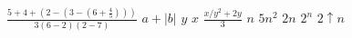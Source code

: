 \documentclass{article}
\begin{document}
$\frac{5 + 4 + (2 - (3 - (6 + \frac{4}{5})))}{3(6 - 2)(2 - 7)}$
$a + |b|$
$y$
$x$
$\frac{x/y^2 + 2y}{3}$
$n$
$5n^2$
$2n$
$2^n$
$2\uparrow n$
\end{document}
